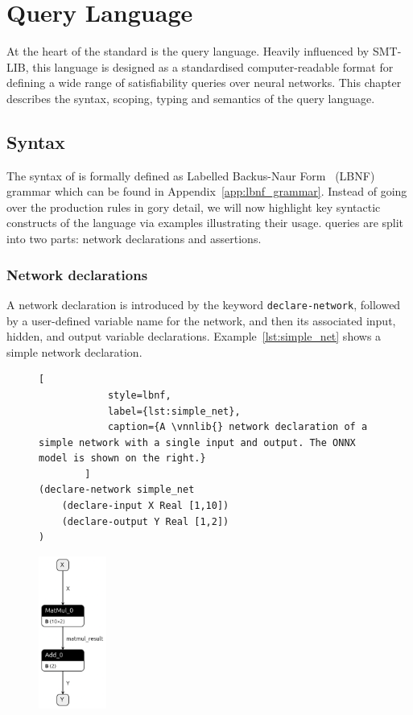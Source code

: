\chapter{\vnnlib{} Query Language}\label{sec:specification_language}

At the heart of the \vnnlib{} standard is the \vnnlib{} query language. Heavily influenced by SMT-LIB, this language is designed as a standardised computer-readable format for defining a wide range of satisfiability queries over neural networks. This chapter describes the syntax, scoping, typing and semantics of the query language.

\section{Syntax}
\label{sec:syntax}

The syntax of \vnnlib{} is formally defined as Labelled Backus-Naur Form~\cite{8} (LBNF) grammar which can be found in Appendix~\ref{app:lbnf_grammar}. Instead of going over the production rules in gory detail, we will now highlight key syntactic constructs of the language via examples illustrating their usage.
\vnnlib{} queries are split into two parts: network declarations and assertions.

\subsection{Network declarations}
\label{sec:network-declarations}
A network declaration is introduced by the keyword \texttt{declare-network}, followed by a user-defined variable name for the network, 
and then its associated input, hidden, and output variable declarations. Example~\ref{lst:simple_net} shows a simple network declaration.

\begin{figure}[h!]
    \begin{minipage}[c]{0.6\textwidth}
        \begin{lstlisting}[
            style=lbnf,
            label={lst:simple_net},
            caption={A \vnnlib{} network declaration of a simple network with a single input and output. The ONNX model is shown on the right.}
        ]
(declare-network simple_net
    (declare-input X Real [1,10])
    (declare-output Y Real [1,2])
)
        \end{lstlisting}
    \end{minipage}%
    \begin{minipage}[c]{0.45\textwidth}
        \centering
        \includegraphics[height=5cm]{imgs/simple_net.onnx.png}
    \end{minipage}
\end{figure}

